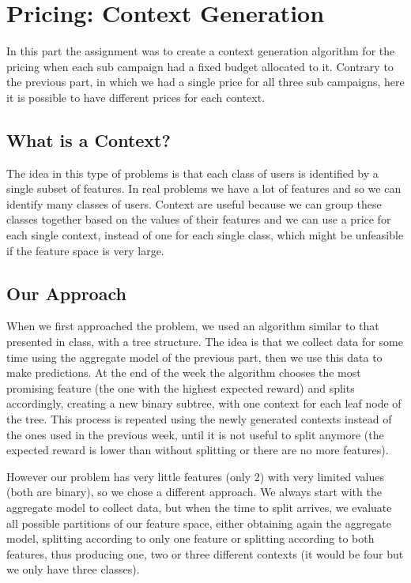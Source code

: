 \chapter{Pricing: Context Generation}

In this part the assignment was to create a context generation algorithm for the pricing when each sub campaign had a fixed budget allocated to it. Contrary to the previous part, in which we had a single price for all three sub campaigns, here it is possible to have different prices for each context.

\section{What is a Context?}
The idea in this type of problems is that each class of users is identified by a single subset of features. In real problems we have a lot of features and so we can identify many classes of users. Context are useful because we can group these classes together based on the values of their features and we can use a price for each single context, instead of one for each single class, which might be unfeasible if the feature space is very large.

\section{Our Approach}
When we first approached the problem, we used an algorithm similar to that presented in class, with a tree structure. The idea is that we collect data for some time using the aggregate model of the previous part, then we use this data to make predictions. At the end of the week the algorithm chooses the most promising feature (the one with the highest expected reward) and splits accordingly, creating a new binary subtree, with one context for each leaf node of the tree. This process is repeated using the newly generated contexts instead of the ones used in the previous week, until it is not useful to split anymore (the expected reward is lower than without splitting or there are no more features).


However our problem has very little features (only 2) with very limited values (both are binary), so we chose a different approach. We always start with the aggregate model to collect data, but when the time to split arrives, we evaluate all possible partitions of our feature space, either obtaining again the aggregate model, splitting according to only one feature or splitting according to both features, thus producing one, two or three different contexts (it would be four but we only have three classes).

